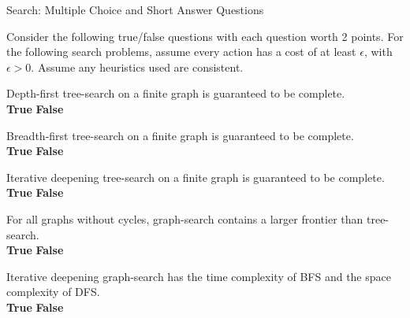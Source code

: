 \usetikzlibrary{shapes}
\begin{problem}{Search: Multiple Choice and Short Answer Questions}

\begin{question}[12]
Consider the following true/false questions with each question worth 2 points. For the following search problems, assume every action has a cost of at least $\epsilon$, with $\epsilon > 0$.  Assume any heuristics used are consistent. 

\vspace{2mm}
\hspace{0.5mm}
Depth-first tree-search on a finite graph is guaranteed to be complete. \\
\solution{\emptycircle}{\FourAATrue} \textbf{True}
\hspace{5mm}
\solution{\emptycircle}{\FourAAFalse} \textbf{False} \\
\solution{}{\FourAAReason}

\vspace{2mm}
\hspace{0.5mm}
Breadth-first tree-search on a finite graph is guaranteed to be complete. \\
\solution{\emptycircle}{\FourABTrue} \textbf{True}
\hspace{5mm}
\solution{\emptycircle}{\FourABFalse} \textbf{False} \\
\solution{}{\FourABReason}

\vspace{2mm}
\hspace{0.5mm}
Iterative deepening tree-search on a finite graph is guaranteed to be complete. \\
\solution{\emptycircle}{\FourACTrue} \textbf{True}
\hspace{5mm}
\solution{\emptycircle}{\FourACFalse} \textbf{False} \\
\solution{}{\FourACReason}

\vspace{2mm}
\hspace{0.5mm}
For all graphs without cycles, graph-search contains a larger frontier than tree-search. \\
\solution{\emptycircle}{\FourADTrue} \textbf{True}
\hspace{5mm}
\solution{\emptycircle}{\FourADFalse} \textbf{False} \\
\solution{}{\FourADReason}

\vspace{2mm}
\hspace{0.5mm}
Iterative deepening graph-search has the time complexity of BFS and the space complexity of DFS. \\
\solution{\emptycircle}{\FourAETrue} \textbf{True}
\hspace{5mm}
\solution{\emptycircle}{\FourAEFalse} \textbf{False} \\
\solution{}{\FourAEReason}


\end{question}
\end{problem}
